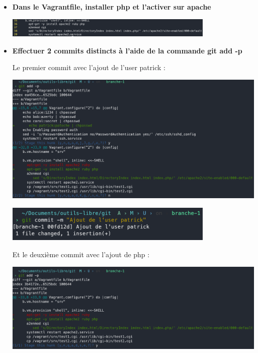 \documentclass[12pt]{article}
\begin{document}
\begin{itemize}
  \item \textbf{Dans le Vagrantfile, installer php et l'activer sur apache}
  \vspace{0.3cm}

  \includegraphics[width=10cm]{images/screen-git-td2-3.png}
\end{itemize}
\vspace{0.3cm}

\begin{itemize}
  \item \textbf{Effectuer 2 commits distincts à l'aide de la commande git add -p}
  \vspace{0.3cm}

  Le premier commit avec l'ajout de l'user patrick :
  \vspace{0.3cm}

  \includegraphics[width=13cm]{images/screen-git-td2-4.png}
  \vspace{0.3cm}

  \includegraphics[width=10cm]{images/screen-git-td2-5.png}
  \vspace{0.3cm}

  Et le deuxième commit avec l'ajout de php :
  \vspace{0.3cm}

  \includegraphics[width=13cm]{images/screen-git-td2-6.png}
  \vspace{0.3cm}


\end{itemize}
\end{document}
